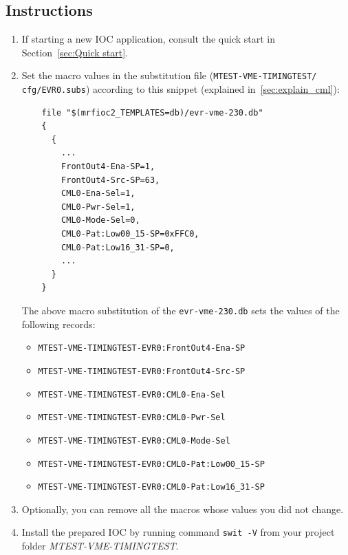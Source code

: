 \documentclass[12pt,a4paper]{article}
\begin{document}
\subsection{Instructions}
\begin{enumerate}
	\item If starting a new IOC application, consult the quick start in Section~\ref{sec:Quick start}.
	
	\item Set the macro values in the substitution file (\texttt{MTEST-VME-TIMINGTEST/} \texttt{cfg/EVR0.subs}) according to this snippet (explained in~\ref{sec:explain_cml}):
\begin{verbatim}
	file "$(mrfioc2_TEMPLATES=db)/evr-vme-230.db"
	{
	  {
	    ...
	    FrontOut4-Ena-SP=1,
	    FrontOut4-Src-SP=63,
	    CML0-Ena-Sel=1,
	    CML0-Pwr-Sel=1,
	    CML0-Mode-Sel=0,
	    CML0-Pat:Low00_15-SP=0xFFC0,
	    CML0-Pat:Low16_31-SP=0, 
	    ...
	  }
	}
\end{verbatim}
	The above macro substitution of the \texttt{evr-vme-230.db} sets the values of the following records:
	\begin{itemize}
		\item \texttt{MTEST-VME-TIMINGTEST-EVR0:FrontOut4-Ena-SP}
		\item \texttt{MTEST-VME-TIMINGTEST-EVR0:FrontOut4-Src-SP}
		\item \texttt{MTEST-VME-TIMINGTEST-EVR0:CML0-Ena-Sel}
		\item \texttt{MTEST-VME-TIMINGTEST-EVR0:CML0-Pwr-Sel}
		\item \texttt{MTEST-VME-TIMINGTEST-EVR0:CML0-Mode-Sel}
		\item \texttt{MTEST-VME-TIMINGTEST-EVR0:CML0-Pat:Low00\_15-SP}
		\item \texttt{MTEST-VME-TIMINGTEST-EVR0:CML0-Pat:Low16\_31-SP}
	\end{itemize}

	\item Optionally, you can remove all the macros whose values you did not change. 
	\item Install the prepared IOC by running command \texttt{swit -V} from your project folder \textit{MTEST-VME-TIMINGTEST}.
\end{enumerate}
\end{document}
